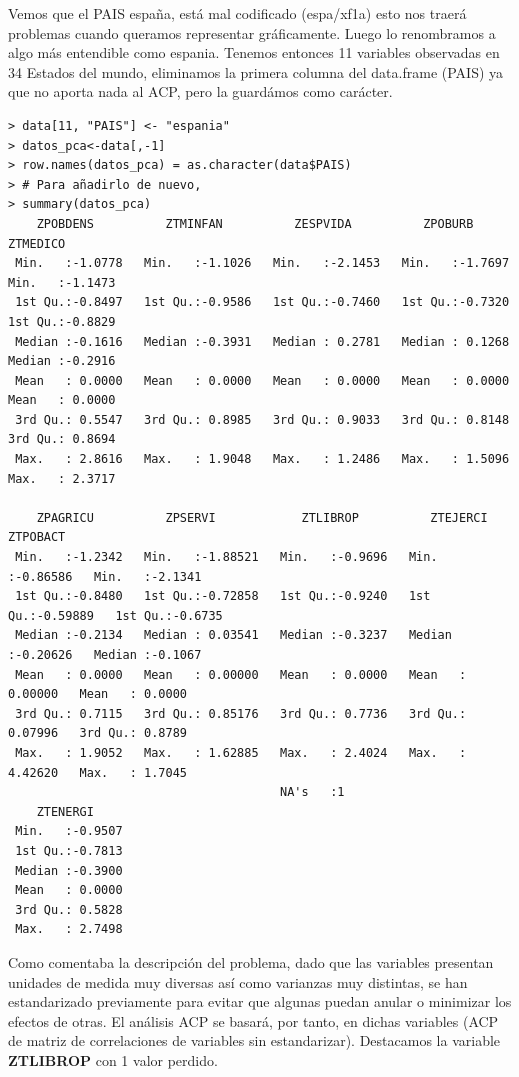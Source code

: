 \documentclass[12pt,twoside]{report}
\begin{document}
\normalsize Vemos que el PAIS españa, está mal codificado (espa\slash xf1a) esto nos traerá problemas cuando queramos representar gráficamente. Luego lo renombramos a algo más entendible como espania. Tenemos entonces 11 variables observadas en 34 Estados del mundo, eliminamos la primera columna del data.frame (PAIS) ya que no aporta nada al ACP, pero la guardámos como carácter.

\footnotesize
\begin{verbatim}
> data[11, "PAIS"] <- "espania"
> datos_pca<-data[,-1]
> row.names(datos_pca) = as.character(data$PAIS)
> # Para añadirlo de nuevo, 
> summary(datos_pca)
    ZPOBDENS          ZTMINFAN          ZESPVIDA          ZPOBURB           ZTMEDICO      
 Min.   :-1.0778   Min.   :-1.1026   Min.   :-2.1453   Min.   :-1.7697   Min.   :-1.1473  
 1st Qu.:-0.8497   1st Qu.:-0.9586   1st Qu.:-0.7460   1st Qu.:-0.7320   1st Qu.:-0.8829  
 Median :-0.1616   Median :-0.3931   Median : 0.2781   Median : 0.1268   Median :-0.2916  
 Mean   : 0.0000   Mean   : 0.0000   Mean   : 0.0000   Mean   : 0.0000   Mean   : 0.0000  
 3rd Qu.: 0.5547   3rd Qu.: 0.8985   3rd Qu.: 0.9033   3rd Qu.: 0.8148   3rd Qu.: 0.8694  
 Max.   : 2.8616   Max.   : 1.9048   Max.   : 1.2486   Max.   : 1.5096   Max.   : 2.3717  
                                                                                          
    ZPAGRICU          ZPSERVI            ZTLIBROP          ZTEJERCI           ZTPOBACT      
 Min.   :-1.2342   Min.   :-1.88521   Min.   :-0.9696   Min.   :-0.86586   Min.   :-2.1341  
 1st Qu.:-0.8480   1st Qu.:-0.72858   1st Qu.:-0.9240   1st Qu.:-0.59889   1st Qu.:-0.6735  
 Median :-0.2134   Median : 0.03541   Median :-0.3237   Median :-0.20626   Median :-0.1067  
 Mean   : 0.0000   Mean   : 0.00000   Mean   : 0.0000   Mean   : 0.00000   Mean   : 0.0000  
 3rd Qu.: 0.7115   3rd Qu.: 0.85176   3rd Qu.: 0.7736   3rd Qu.: 0.07996   3rd Qu.: 0.8789  
 Max.   : 1.9052   Max.   : 1.62885   Max.   : 2.4024   Max.   : 4.42620   Max.   : 1.7045  
                                      NA's   :1                                             
    ZTENERGI      
 Min.   :-0.9507  
 1st Qu.:-0.7813  
 Median :-0.3900  
 Mean   : 0.0000  
 3rd Qu.: 0.5828  
 Max.   : 2.7498  
\end{verbatim}
\normalsize

Como comentaba la descripción del problema, dado que las variables presentan unidades de medida muy diversas así como varianzas muy distintas, se han estandarizado previamente para evitar que algunas puedan anular o minimizar los efectos de otras. El análisis ACP se basará, por tanto, en dichas variables (ACP de matriz de correlaciones de variables sin estandarizar). Destacamos la variable \textbf{ZTLIBROP} con 1 valor perdido.
 
\end{document}
